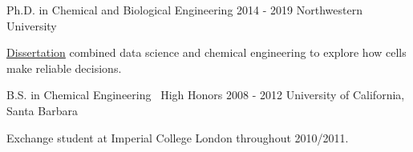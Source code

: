 

\begin{cventries}

  \cventrynew
	{Ph.D. in Chemical and Biological Engineering} 	
	{2014 - 2019}
	{Northwestern University}
    { \begin{cvitems} 
      	\item {\href{https://github.com/sebastianbernasek/dissertation}{Dissertation} combined data science and chemical engineering to explore how cells make reliable decisions.}
      \end{cvitems}}
            	   
  \cventrynew
	{B.S. in Chemical Engineering \bullet\ High Honors} 	
	{2008 - 2012} 	
	{University of California, Santa Barbara}    
    {
      \begin{cvitems} %
      	\item {Exchange student at Imperial College London throughout 2010/2011.}      	
      \end{cvitems}
    }

\end{cventries}
